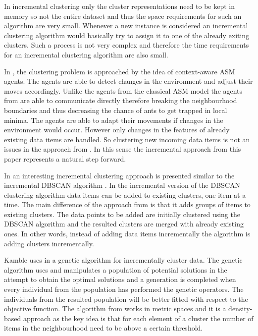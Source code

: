 In incremental clustering only the cluster representations need to be kept in memory so not the entire dataset and thus the space requirements for such an algorithm are very small. Whenever a new instance is considered an incremental clustering algorithm would basically try to assign it to one of the already exiting clusters. Such a process is not very complex and therefore the time requirements for an incremental clustering algorithm are also small.

In \cite{Gaceanu11AContext}, the clustering problem is approached by the idea of context-aware ASM agents. The agents are able to detect changes in the environment and adjust their moves accordingly. Unlike the agents from the classical ASM model \cite{Chen04AnAdaptive} the agents from \cite{Gaceanu11AContext}  are able to communicate directly therefore breaking the neighbourhood boundaries and thus decreasing the chance of ants to get trapped in local minima. The agents are able to adapt their movements if changes in the environment would occur. However only changes in the features of already existing data items are handled. So clustering new incoming data items is not an issues in the approach from \cite{Gaceanu11AContext}. In this sense the incremental approach from this paper represents a natural step forward.

In \cite{Goyal} an interesting incremental clustering approach is presented similar to the incremental DBSCAN algorithm \cite{DBSCANIncremental}. In the incremental version of the  DBSCAN clustering algorithm data items can be added to existing clusters, one item at a time. The main difference of the approach from \cite{Goyal} is that it adds groups of items to existing clusters. The data points to be added are initially clustered using the DBSCAN algorithm \cite{DBSCAN} and the resulted clusters are merged with already existing ones. In other words, instead of adding data items incrementally the algorithm is adding clusters incrementally. 

Kamble uses in \cite{Kamble} a genetic algorithm for incrementally cluster data. The genetic algorithm \cite{Genetic} uses and manipulates a population of potential solutions in the attempt to obtain the optimal solutions and a generation is completed when every individual from the population has performed the genetic operators. The individuals from the resulted population will be better fitted with respect to the objective function. The algorithm from \cite{Kamble} works in metric spaces and it is a density-based approach as the key idea is that for each element of a cluster the number of items in the neighbourhood need to be above a certain threshold.

